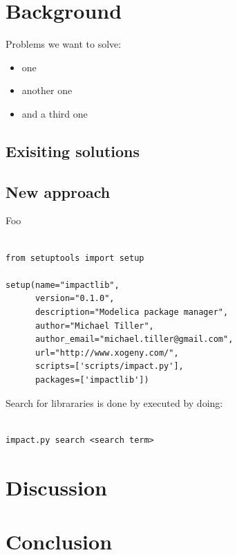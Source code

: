 \documentclass[11pt,a4paper,twocolumn]{article}
\begin{document}
\section{Background}
\label{sec:background}

Problems we want to solve:
\begin{itemize}
\item one
\item another one
\item and a third one
\end{itemize}


\subsection{Exisiting solutions}
\label{sec:exist-sol}

\subsection{New approach}
\label{sec:exist-sol}
Foo
\lstset{language=python}
\begin{lstlisting}[frame=single]  % Start your code-block

from setuptools import setup

setup(name="impactlib",
      version="0.1.0",
      description="Modelica package manager",
      author="Michael Tiller",
      author_email="michael.tiller@gmail.com",
      url="http://www.xogeny.com/",
      scripts=['scripts/impact.py'],
      packages=['impactlib'])
\end{lstlisting}


Search for librararies is done by executed by doing:
\lstset{language=bash}
\begin{lstlisting}[frame=shadowbox]  % Start your code-block

impact.py search <search term>
\end{lstlisting}

\section{Discussion}
\label{sec:discussion}

\section{Conclusion}
\label{sec:conclusion}


\end{document}
